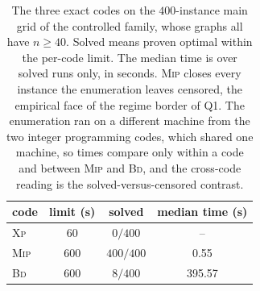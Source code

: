 \begin{table}[H]
\centering
\caption{The three exact codes on the $400$-instance main grid of the
controlled family, whose graphs all have $n\ge 40$. Solved means proven
optimal within the per-code limit. The median time is over solved runs
only, in seconds. \textsc{Mip} closes every instance the enumeration
leaves censored, the empirical face of the regime border of Q1. The
enumeration ran on a different machine from the two integer programming
codes, which shared one machine, so times compare only within a code
and between \textsc{Mip} and \textsc{Bd}, and the cross-code reading
is the solved-versus-censored contrast.}
\label{tab:q2codes}
\begin{tabular}{lccc}
\hline
code & limit (s) & solved & median time (s) \\
\hline
\textsc{Xp} & $60$ & $0/400$ & -- \\
\textsc{Mip} & $600$ & $400/400$ & 0.55 \\
\textsc{Bd} & $600$ & $8/400$ & 395.57 \\
\hline
\end{tabular}
\end{table}
